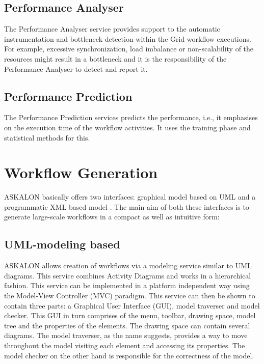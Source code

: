 \documentclass[9pt,twocolumn,twoside]{../../styles/osajnl}
\begin{document}
\subsection{Performance Analyser}
The Performance Analyser service provides support to the
automatic instrumentation and bottleneck detection within the Grid
workflow executions.  For example, excessive synchronization, load
imbalance or non-scalability of the resources might result in a
bottleneck and it is the responsibility of the Performance Analyser to
detect and report it.

\subsection{Performance Prediction}
The Performance Prediction services predicts the performance,
i.e., it emphasises on the execution time of the workflow activities.
It uses the training phase and statistical methods for this.

\section{Workflow Generation}
ASKALON basically offers two interfaces: graphical model based on UML
and a programmatic XML based model \cite{Workflow-book}.  The main aim
of both these interfaces is to generate large-scale workflows in a
compact as well as intuitive form:

\subsection{UML-modeling based}
ASKALON allows creation of workflows via a modeling service similar to
UML diagrams.  This service combines Activity Diagrams and works in a
hierarchical fashion.  This service can be implemented in a platform
independent way using the Model-View Controller (MVC) paradigm.  This
service can then be shown to contain three parts: a Graphical User
Interface (GUI), model traverser and model checker.  This GUI in turn
comprises of the menu, toolbar, drawing space, model tree and the
properties of the elements.  The drawing space can contain several
diagrams.  The model traverser, as the name suggests, provides a way
to move throughout the model visiting each element and accessing its
properties.  The model checker on the other hand is responsible for
the correctness of the model.
\end{document}
